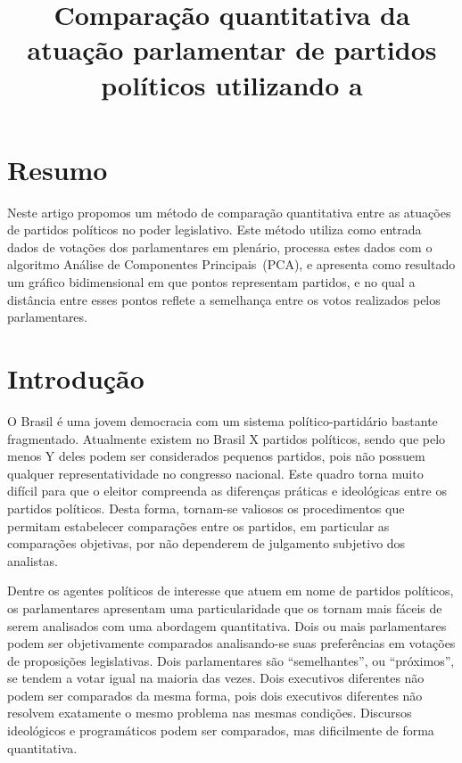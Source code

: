 \documentclass[a4paper, 12pt]{article}
\title{Comparação quantitativa da atuação parlamentar de partidos políticos utilizando a \pca}
\author{}
\date{}
\newcommand\pca{Análise de Componentes Principais}
\begin{document}
 
\maketitle 
 
\section*{Resumo}

Neste artigo propomos um método de comparação quantitativa entre as atuações de partidos políticos no poder legislativo.
Este método utiliza como entrada dados de votações dos parlamentares em plenário, processa estes dados com o algoritmo \pca\ (PCA), e apresenta como resultado um gráfico bidimensional em que pontos representam partidos, e no qual a distância entre esses pontos reflete a semelhança entre os votos realizados pelos parlamentares. 

\section{Introdução}
\label{sec:intro}


O Brasil é uma jovem democracia com um sistema político-partidário bastante fragmentado.
Atualmente existem no Brasil X partidos políticos, sendo que pelo menos Y deles podem ser considerados pequenos partidos, pois não possuem qualquer representatividade no congresso nacional.
Este quadro torna muito difícil para que o eleitor compreenda as diferenças práticas e ideológicas entre os partidos políticos. Desta forma, tornam-se valiosos os procedimentos que permitam estabelecer comparações entre os partidos, em particular as comparações objetivas, por não dependerem de julgamento subjetivo dos analistas. 

Dentre os agentes políticos de interesse que atuem em nome de partidos políticos, os parlamentares apresentam uma particularidade que os tornam mais fáceis de serem analisados com uma abordagem quantitativa. Dois ou mais parlamentares podem ser objetivamente comparados analisando-se suas preferências em votações de proposições legislativas. Dois parlamentares são ``semelhantes'', ou ``próximos'', se tendem a votar igual na maioria das vezes. Dois executivos diferentes não podem ser comparados da mesma forma, pois dois executivos diferentes não resolvem exatamente o mesmo problema nas mesmas condições. Discursos ideológicos e programáticos podem ser comparados, mas dificilmente de forma quantitativa. 
\end{document}
